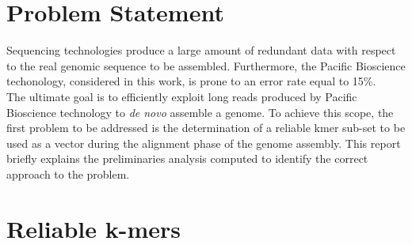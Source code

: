 \documentclass[11pt]{article}
\begin{document}
\maketitle

\section{Problem Statement}

Sequencing technologies produce a large amount of redundant data with respect to the real genomic sequence to be assembled.
Furthermore, the Pacific Bioscience techonology, considered in this work, is prone to an error rate equal to 15\%.\\
The ultimate goal is to efficiently exploit long reads produced by Pacific Bioscience technology to \emph{de novo} assemble a genome.
To achieve this scope, the first problem to be addressed is the determination of a reliable kmer sub-set to be used as a vector during the alignment phase of the genome assembly.
This report briefly explains the preliminaries analysis computed to identify the correct approach to the problem.
\section{Reliable k-mers}\label{rks}
\end{document}
